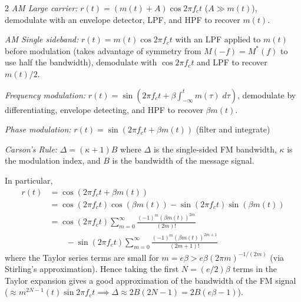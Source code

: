 \documentclass[9pt]{article}
\begin{document}
\begin{multicols}{2}
\emph{AM Large carrier:} $r(t) = (m(t) + A) \cos 2\pi f_c t$ ($A \gg m(t)$), demodulate with an envelope detector, LPF, and HPF to recover $m(t)$.

\emph{AM Single sideband:} $r(t) = m(t) \cos 2\pi f_c t$ with an LPF applied to $m(t)$ before modulation (takes advantage of symmetry from $M(-f) = M^*(f)$ to use half the bandwidth), demodulate with $\cos 2\pi f_c t$ and LPF to recover $m(t)/2$.

\emph{Frequency modulation:} $r(t) = \sin (2\pi f_c t + \beta \int_{-\infty}^t m(\tau)\; d\tau)$, demodulate by differentiating, envelope detecting, and HPF to recover $\beta m(t)$.

\emph{Phase modulation:} $r(t) = \sin (2\pi f_c t + \beta m(t))$ (filter and integrate)

\emph{Carson's Rule:} $\Delta = (\kappa + 1)B$ where $\Delta$ is the single-sided FM bandwidth, $\kappa$ is the modulation index, and $B$ is the bandwidth of the message signal. 

In particular, 
\begin{align*}
r(t) &= \cos(2\pi f_c t + \beta m(t))\\ 
    &= \cos(2\pi f_c t) \cos(\beta m(t)) - \sin(2\pi f_c t) \sin(\beta m(t))\\
    &= \cos(2\pi f_c t) \sum_{m=0}^{\infty} \frac{(-1)^m (\beta m(t))^{2m}}{(2m)!} \\ 
        &\qquad - \sin(2\pi f_c t) \sum_{m=0}^{\infty} \frac{(-1)^m (\beta m(t))^{2m + 1}}{(2m + 1)!}
\end{align*}
where the Taylor series terms are small for $m = e\beta > e\beta (2\pi m)^{-1/(2m)}$ (via Stirling's approximation). Hence taking the first $N = (e/2) \beta$ terms in the Taylor expansion gives a good approximation of the bandwidth of the FM signal ($\approx m^{2N-1}(t) \sin 2\pi f_c t \implies \Delta \approx 2B(2N - 1) = 2B(e\beta - 1)$).

\end{multicols}
\end{document}
